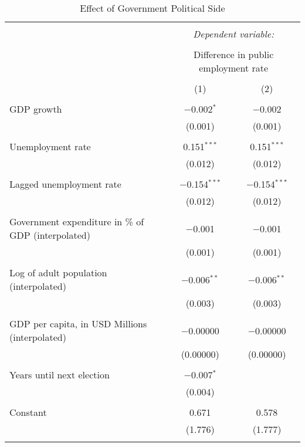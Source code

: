 
\begin{table}[!htbp] \centering 
  \caption{Effect of Government Political Side} 
  \label{} 
\begin{tabular}{@{\extracolsep{5pt}}lcc} 
\\[-1.8ex]\hline 
\hline \\[-1.8ex] 
 & \multicolumn{2}{c}{\textit{Dependent variable:}} \\ 
\cline{2-3} 
\\[-1.8ex] & \multicolumn{2}{c}{Difference in public employment rate} \\ 
\\[-1.8ex] & (1) & (2)\\ 
\hline \\[-1.8ex] 
 GDP growth & $-$0.002$^{*}$ & $-$0.002 \\ 
  & (0.001) & (0.001) \\ 
  & & \\ 
 Unemployment rate & 0.151$^{***}$ & 0.151$^{***}$ \\ 
  & (0.012) & (0.012) \\ 
  & & \\ 
 Lagged unemployment rate & $-$0.154$^{***}$ & $-$0.154$^{***}$ \\ 
  & (0.012) & (0.012) \\ 
  & & \\ 
 Government expenditure in \% of GDP (interpolated) & $-$0.001 & $-$0.001 \\ 
  & (0.001) & (0.001) \\ 
  & & \\ 
 Log of adult population (interpolated) & $-$0.006$^{**}$ & $-$0.006$^{**}$ \\ 
  & (0.003) & (0.003) \\ 
  & & \\ 
 GDP per capita, in USD Millions (interpolated) & $-$0.00000 & $-$0.00000 \\ 
  & (0.00000) & (0.00000) \\ 
  & & \\ 
 Years until next election & $-$0.007$^{*}$ &  \\ 
  & (0.004) &  \\ 
  & & \\ 
 Constant & 0.671 & 0.578 \\ 
  & (1.776) & (1.777) \\ 
  & & \\ 

\end{tabular}
\end{table}
